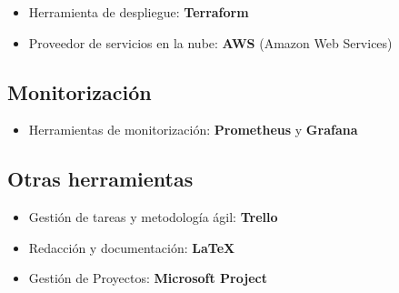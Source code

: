 \begin{itemize}
    \item Herramienta de despliegue: \textbf{Terraform}
    \item Proveedor de servicios en la nube: \textbf{AWS} (Amazon Web Services)
\end{itemize}

\subsection{Monitorización}

\begin{itemize}
    \item Herramientas de monitorización: \textbf{Prometheus} y \textbf{Grafana}
\end{itemize}

\subsection{Otras herramientas}

\begin{itemize}
    \item Gestión de tareas y metodología ágil: \textbf{Trello}
    \item Redacción y documentación: \textbf{LaTeX}
    \item Gestión de Proyectos: \textbf{Microsoft Project}
\end{itemize}
